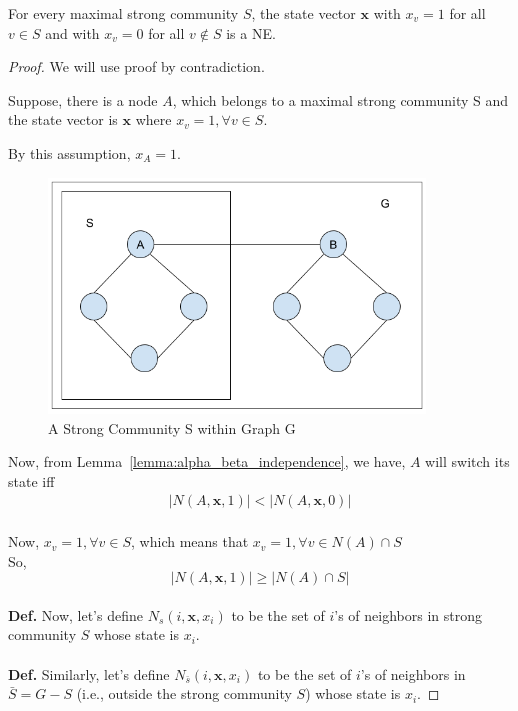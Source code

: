 \begin{lemma}
For every maximal strong community $S$, the state vector $\mathbf{x}$ with $x_v=1$ for all $v\in S$ and with $x_v=0$ for all $v\notin S$ is a NE.

\begin{proof}
We will use proof by contradiction.

Suppose, there is a node $A$, which belongs to a maximal strong community S and the state vector is $\mathbf{x}$ where $x_v = 1, \forall{v \in S}$.


By this assumption, $x_A = 1$.

\begin{figure}[H]
    \centering
    \includegraphics[width=10cm]{figs/strong_community.png}
    \caption{A Strong Community S within Graph G}
    \label{fig:strong_community}
\end{figure}


Now, from Lemma~\ref{lemma:alpha_beta_independence}, we have, $A$ will switch its state iff
\begin{align}
\label{eq:switch_A}
|N(A, \mathbf{x}, 1)|  < |N(A, \mathbf{x},0)|
\end{align}
\\
Now, $x_v=1, \forall{v \in S} $, which means that $x_v=1, \forall{v \in N(A) \cap S} $ \\
So, 
\begin{equation}
|N(A, \mathbf{x}, 1)| \geq |N(A) \cap S|
\end{equation}
\\
\textbf{Def.} Now, let's define $N_s(i, \mathbf{x}, x_i)$ to be the set of $i$'s of neighbors in strong community $S$ whose state is $x_i$.
\\
\\
\textbf{Def.} Similarly, let's define $N_{\bar{s}}(i, \mathbf{x}, x_i)$ to be the set of $i$'s of neighbors in $\bar{S} = G-S$ (i.e., outside the strong community $S$) whose state is $x_i$.



\end{proof}
\end{lemma}
